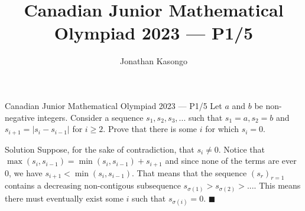 \documentclass{article}
\author{Jonathan Kasongo}
\title{Canadian Junior Mathematical Olympiad 2023 --- P1/5}
\begin{document}
\maketitle

\begin{problem}{Canadian Junior Mathematical Olympiad 2023 --- P1/5}
Let $a$ and $b$ be non-negative integers. Consider a sequence $s_1, s_2,
s_3, ...$ such that $s_1 = a, s_2 = b$ and $s_{i+1} = |s_i - s_{i-1}|$
for $i \geq 2$. Prove that there is some $i$ for which $s_i = 0$.
\end{problem}

\begin{solution}{Solution}
Suppose, for the sake of contradiction, that $s_i \neq 0$. Notice that
$\max (s_i, s_{i-1}) = \min (s_i, s_{i-1}) + s_{i+1}$ and since none of
the terms are ever 0, we have $s_{i+1} < \min (s_i, s_{i-1})$. That
means that the sequence $(s_r)_{r=1}$ contains a decreasing
non-contigous subsequence $s_{\sigma (1)} > s_{\sigma (2)} > ...$. This
means there must eventually exist some $i$ such that $s_{\sigma (i)} = 0$.
$\blacksquare$
\end{solution}
\end{document}
